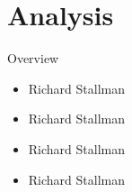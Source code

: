 \section{Analysis}\frame{\sectionpage}

\begin{frame}{Overview}
  \begin{itemize}
    \item Richard Stallman
    \item Richard Stallman
    \item Richard Stallman
    \item Richard Stallman
  \end{itemize}
\end{frame}